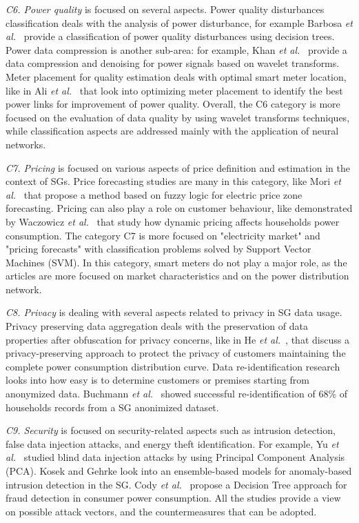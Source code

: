 \documentclass[journal]{IEEEtran}
\begin{document}
\textit{C6. Power quality} is focused on several aspects. Power quality disturbances classification deals with the analysis of power disturbance, for example Barbosa \textit{et al.}~ provide a classification of power quality disturbances using decision trees. Power data compression is another sub-area: for example, Khan \textit{et al.}~ provide a data compression and denoising for power signals based on wavelet transforms. Meter placement for quality estimation deals with optimal smart meter location, like in Ali \textit{et al.}~ that look into optimizing meter placement to identify the best power links for improvement of power quality.
Overall, the C6 category is more focused on the evaluation of data quality by using wavelet transforms techniques, while classification aspects are addressed mainly with the application of neural networks. 

\textit{C7. Pricing} is focused on various aspects of price definition and estimation in the context of SGs. Price forecasting studies are many in this category, like Mori \textit{et al.}~ that propose a method based on fuzzy logic for electric price zone forecasting. Pricing can also play a role on customer behaviour, like demonstrated by Waczowicz \textit{et al.}~ that study how dynamic pricing affects households power consumption. The category C7 is more focused on "electricity market" and "pricing forecasts" with classification problems solved by Support Vector Machines (SVM). In this category, smart meters do not play a major role, as the articles are more focused on market characteristics and on the power distribution network.

\textit{C8. Privacy} is dealing with several aspects related to privacy in SG data usage. Privacy preserving data aggregation deals with the preservation of data properties after obfuscation for privacy concerns, like in He \textit{et al.}~, that discuss a privacy-preserving approach to protect the privacy of customers maintaining the complete power consumption distribution curve. Data re-identification research looks into how easy is to determine customers or premises starting from anonymized data. Buchmann \textit{et al.}~ showed successful re-identification of 68\% of households records from a SG anonimized dataset.

\textit{C9. Security} is focused on security-related aspects such as intrusion detection, false data injection attacks, and energy theft identification. For example, Yu \textit{et al.}~ studied blind data injection attacks by using Principal Component Analysis (PCA). Kosek and Gehrke  look into an ensemble-based models for anomaly-based intrusion detection in the SG.  Cody \textit{et al.}~ propose a Decision Tree approach for fraud detection in consumer power consumption. All the studies provide a view on possible attack vectors, and the countermeasures that can be adopted.
\end{document}
